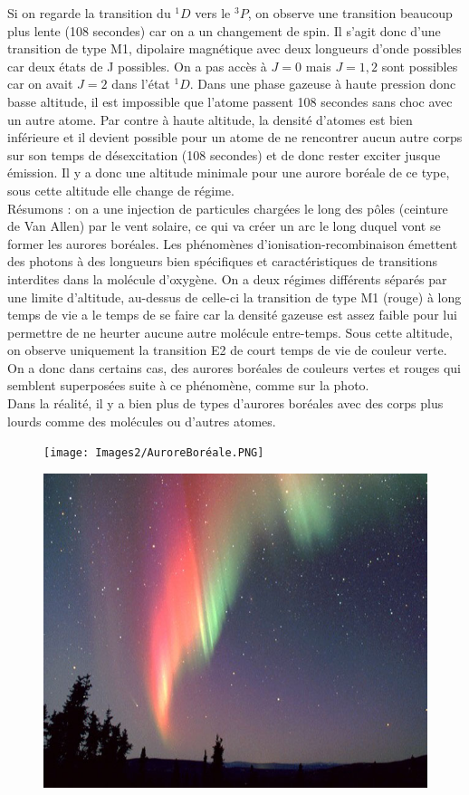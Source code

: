 Si on regarde la transition du $^1D$ vers le $^3P$, on observe une transition beaucoup plus lente (108 secondes) car on a un changement de spin. Il s'agit donc d'une transition de type M1, dipolaire magnétique avec deux longueurs d'onde possibles car deux états de J possibles. On a pas accès à $J=0$ mais $J=1,2$ sont possibles car on avait $J=2$ dans l'état $^1D$. Dans une phase gazeuse à haute pression donc basse altitude, il est impossible que l'atome passent 108 secondes sans choc avec un autre atome. Par contre à haute altitude, la densité d'atomes est bien inférieure et il devient possible pour un atome de ne rencontrer aucun autre corps sur son temps de désexcitation (108 secondes) et de donc rester exciter jusque émission. Il y a donc une altitude minimale pour une aurore boréale de ce type, sous cette altitude elle change de régime.\\

Résumons : on a une injection de particules chargées le long des pôles (ceinture de Van Allen) par le vent solaire, ce qui va créer un arc le long duquel vont se former les aurores boréales. Les phénomènes d'ionisation-recombinaison émettent des photons à des longueurs bien spécifiques et caractéristiques de transitions interdites dans la molécule d'oxygène. On a deux régimes différents séparés par une limite d'altitude, au-dessus de celle-ci la transition de type M1 (rouge) à long temps de vie a le temps de se faire car la densité gazeuse est assez faible pour lui permettre de ne heurter aucune autre molécule entre-temps. Sous cette altitude, on observe uniquement la transition E2 de court temps de vie de couleur verte. On a donc dans certains cas, des aurores boréales de couleurs vertes et rouges qui semblent superposées suite à ce phénomène, comme sur la photo.\\

Dans la réalité, il y a bien plus de types d'aurores boréales avec des corps plus lourds comme des molécules ou d'autres atomes.\\

\begin{figure}[htp]
    \centering
    \texttt{[image: Images2/AuroreBoréale.PNG]}
\end{figure}
\begin{figure}[htp]
    \centering
    \includegraphics[scale=0.6]{Images2/photoAurore.jpg}
\end{figure}